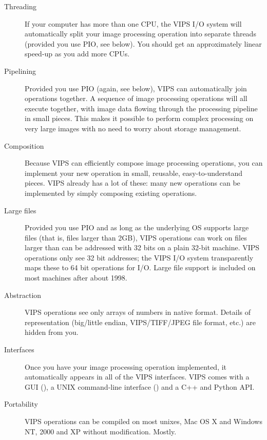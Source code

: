 \begin{description}

\item[Threading]
If your computer has more than one CPU, the VIPS I/O system will automatically
split your image processing operation into separate threads (provided you
use PIO, see below). You should get an approximately linear speed-up as
you add more CPUs.

\item[Pipelining]
Provided you use PIO (again, see below), VIPS can automatically join
operations together. A sequence of image processing operations will all
execute together, with image data flowing through the processing pipeline
in small pieces. This makes it possible to perform complex processing on
very large images with no need to worry about storage management.

\item[Composition]
Because VIPS can efficiently compose image processing operations, you can
implement your new operation in small, reusable, easy-to-understand
pieces. VIPS already has a lot of these: many new operations can be
implemented by simply composing existing operations.

\item[Large files]
Provided you use PIO and as long as the underlying OS supports large files
(that is, files larger than 2GB), VIPS operations can work on files larger
than can be addressed with 32 bits on a plain 32-bit machine. VIPS operations
only see 32 bit addresses; the VIPS I/O system transparently maps these to
64 bit operations for I/O. Large file support is included on most machines
after about 1998.

\item[Abstraction]
VIPS operations see only arrays of numbers in native format. Details of
representation (big/little endian, VIPS/TIFF/JPEG file format, etc.) are 
hidden from you.

\item[Interfaces]
Once you have your image processing operation implemented, it automatically
appears in all of the VIPS interfaces. VIPS comes with a GUI (\nip{}), a
UNIX command-line interface (\vips{}) and a C++ and Python API.

\item[Portability]
VIPS operations can be compiled on most unixes, Mac OS X and Windows NT, 2000
and XP without modification. Mostly.

\end{description}

